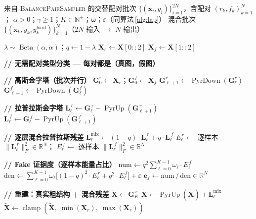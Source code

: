 \documentclass[12pt]{article}
\begin{document}
\clearpage
\begin{algorithm}[p]
\caption{RFPairLapPyramidMixup（v2 采样器，仅 RF 配对）}
\label{alg:rf_lap}
\begin{algorithmic}[1]\scriptsize
\Require
  来自 \textsc{BalancePairSampler} 的交替配对批次
  $\{(\mathbf{x}_i, y_i)\}_{i=1}^{2N}$，含配对 $(r_k, f_k)_{k=1}^{N}$；
  $\alpha > 0$；$\gamma \ge 1$；$K \in \mathbb{N}^+$；$\bm{\omega}$；$\varepsilon$（同算法\,\ref{alg:lap}）
\Ensure
  混合批次 $\{(\tilde{\mathbf{x}}_k, \tilde{y}_k, y^{\text{hard}}_k)\}_{k=1}^{N}$（$2N$ 输入 $\to$ $N$ 输出）

\State $\lambda \sim \operatorname{Beta}(\alpha, \alpha)$；\quad $q \gets 1 - \lambda$
\State $\mathbf{X}_r \gets \mathbf{X}[0::2]$ 
\State $\mathbf{X}_f \gets \mathbf{X}[1::2]$ 

\State \textbf{// 无需配对类型分类 — 每对都是（真图，假图）}

\State \textbf{// 高斯金字塔（批次并行）}
\State $\mathbf{G}_0^r \gets \mathbf{X}_r$；\quad $\mathbf{G}_0^f \gets \mathbf{X}_f$
  \State $\mathbf{G}_{\ell+1}^r \gets \operatorname{PyrDown}(\mathbf{G}_\ell^r)$
  \State $\mathbf{G}_{\ell+1}^f \gets \operatorname{PyrDown}(\mathbf{G}_\ell^f)$
\EndFor

\State \textbf{// 拉普拉斯金字塔}
  \State $\mathbf{L}_\ell^{\,r} \gets \mathbf{G}_\ell^{\,r} - \operatorname{PyrUp}(\mathbf{G}_{\ell+1}^{\,r})$
  \State $\mathbf{L}_\ell^{\,f} \gets \mathbf{G}_\ell^{\,f} - \operatorname{PyrUp}(\mathbf{G}_{\ell+1}^{\,f})$
\EndFor

\State \textbf{// 逐层混合拉普拉斯残差}
  \State $\mathbf{L}_\ell^{\text{mix}} \gets (1 - q) \cdot \mathbf{L}_\ell^{\,r} + q \cdot \mathbf{L}_\ell^{\,f}$
  \State $E_\ell^{\,r} \gets$ 逐样本 $\|\mathbf{L}_\ell^{\,r}\|_F^2 \in \mathbb{R}^{N}$；\quad
        $E_\ell^{\,f} \gets$ 逐样本 $\|\mathbf{L}_\ell^{\,f}\|_F^2 \in \mathbb{R}^{N}$
\EndFor

\State \textbf{// Fake 证据度（逐样本能量占比）}
\State $\text{num} \gets q^2 \sum_{\ell=0}^{K-1} \omega_\ell \cdot E_\ell^{\,f}$
\State $\text{den} \gets \sum_{\ell=0}^{K-1} \omega_\ell\big[(1-q)^2 \cdot E_\ell^{\,r} + q^2 \cdot E_\ell^{\,f}\big] + \varepsilon$
\State $\mathbf{e}_f \gets \text{num} \,/\, \text{den} \in \mathbb{R}^{N}$

\State \textbf{// 重建：真实粗结构 + 混合残差}
\State $\tilde{\mathbf{X}} \gets \mathbf{G}_K^{\,r}$ 
  \State $\tilde{\mathbf{X}} \gets \operatorname{PyrUp}(\tilde{\mathbf{X}}) + \mathbf{L}_\ell^{\text{mix}}$
\EndFor
\State $\tilde{\mathbf{X}} \gets \operatorname{clamp}(\tilde{\mathbf{X}},\; \min(\mathbf{X}_r),\; \max(\mathbf{X}_r))$ 


\end{algorithmic}
\end{algorithm}
\end{document}
